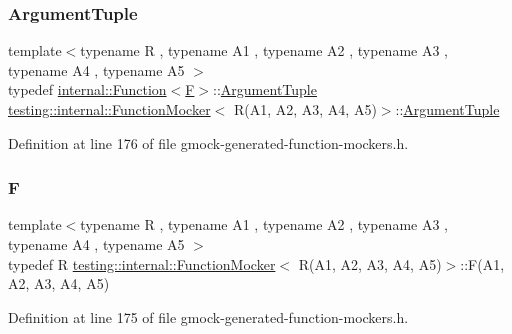 \subsubsection{\texorpdfstring{Argument\+Tuple}{ArgumentTuple}}
{\footnotesize\ttfamily template$<$typename R , typename A1 , typename A2 , typename A3 , typename A4 , typename A5 $>$ \\
typedef \hyperlink{structtesting_1_1internal_1_1Function}{internal\+::\+Function}$<$\hyperlink{classtesting_1_1internal_1_1FunctionMocker_3_01R_07A1_00_01A2_00_01A3_00_01A4_00_01A5_08_4_a26144c33c64b0af26a1d0c43806a0370}{F}$>$\+::\hyperlink{classtesting_1_1internal_1_1FunctionMocker_3_01R_07A1_00_01A2_00_01A3_00_01A4_00_01A5_08_4_ac82403b3f3e4e65797bb633ade91a43e}{Argument\+Tuple} \hyperlink{classtesting_1_1internal_1_1FunctionMocker}{testing\+::internal\+::\+Function\+Mocker}$<$ R(A1, A2, A3, A4, A5)$>$\+::\hyperlink{classtesting_1_1internal_1_1FunctionMocker_3_01R_07A1_00_01A2_00_01A3_00_01A4_00_01A5_08_4_ac82403b3f3e4e65797bb633ade91a43e}{Argument\+Tuple}}



Definition at line 176 of file gmock-\/generated-\/function-\/mockers.\+h.

\mbox{\label{classtesting_1_1internal_1_1FunctionMocker_3_01R_07A1_00_01A2_00_01A3_00_01A4_00_01A5_08_4_a26144c33c64b0af26a1d0c43806a0370}} 
\subsubsection{\texorpdfstring{F}{F}}
{\footnotesize\ttfamily template$<$typename R , typename A1 , typename A2 , typename A3 , typename A4 , typename A5 $>$ \\
typedef R \hyperlink{classtesting_1_1internal_1_1FunctionMocker}{testing\+::internal\+::\+Function\+Mocker}$<$ R(A1, A2, A3, A4, A5)$>$\+::F(A1, A2, A3, A4, A5)}



Definition at line 175 of file gmock-\/generated-\/function-\/mockers.\+h.



